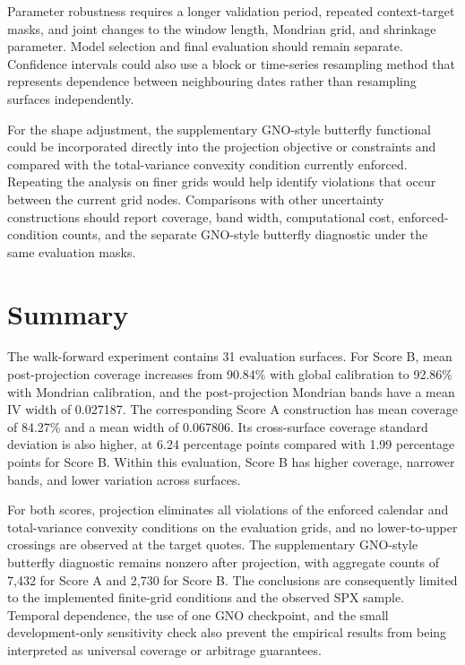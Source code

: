 Parameter robustness requires a longer validation period, repeated context-target masks, and joint changes to the window length, Mondrian grid, and shrinkage parameter. Model selection and final evaluation should remain separate. Confidence intervals could also use a block or time-series resampling method that represents dependence between neighbouring dates rather than resampling surfaces independently.

\pagebreak
For the shape adjustment, the supplementary GNO-style butterfly functional could be incorporated directly into the projection objective or constraints and compared with the total-variance convexity condition currently enforced. Repeating the analysis on finer grids would help identify violations that occur between the current grid nodes. Comparisons with other uncertainty constructions should report coverage, band width, computational cost, enforced-condition counts, and the separate GNO-style butterfly diagnostic under the same evaluation masks.

\section{Summary}
\label{sec:disc_summary}

The walk-forward experiment contains 31 evaluation surfaces. For Score B, mean post-projection coverage increases from 90.84\% with global calibration to 92.86\% with Mondrian calibration, and the post-projection Mondrian bands have a mean IV width of 0.027187. The corresponding Score A construction has mean coverage of 84.27\% and a mean width of 0.067806. Its cross-surface coverage standard deviation is also higher, at 6.24 percentage points compared with 1.99 percentage points for Score B. Within this evaluation, Score B has higher coverage, narrower bands, and lower variation across surfaces.

For both scores, projection eliminates all violations of the enforced calendar and total-variance convexity conditions on the evaluation grids, and no lower-to-upper crossings are observed at the target quotes. The supplementary GNO-style butterfly diagnostic remains nonzero after projection, with aggregate counts of 7,432 for Score A and 2,730 for Score B. The conclusions are consequently limited to the implemented finite-grid conditions and the observed SPX sample. Temporal dependence, the use of one GNO checkpoint, and the small development-only sensitivity check also prevent the empirical results from being interpreted as universal coverage or arbitrage guarantees.

